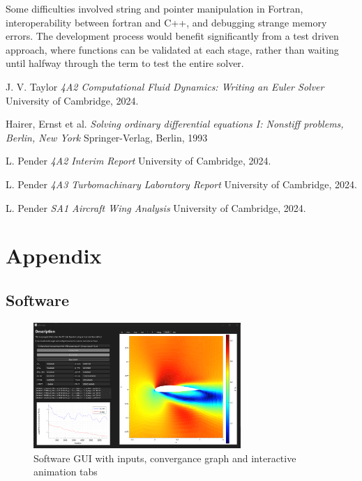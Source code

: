 \documentclass{article}
\begin{document}
Some difficulties involved string and pointer manipulation in Fortran, interoperability between fortran and C++, and debugging strange memory errors.
The development process would benefit significantly from a test driven approach, where functions can be validated at each stage, rather than waiting until halfway through the term to test the entire solver.

\begin{thebibliography}{9}

    J. V. Taylor
    \emph{4A2 Computational Fluid Dynamics: Writing an Euler Solver}
    University of Cambridge,
    2024.

    Hairer, Ernst et al.
    \emph{Solving ordinary differential equations I: Nonstiff problems, Berlin, New York}
    Springer-Verlag, Berlin, 1993

    L. Pender
    \emph{4A2 Interim Report}
    University of Cambridge,
    2024.

    L. Pender
    \emph{4A3 Turbomachinary Laboratory Report}
    University of Cambridge,
    2024.

    L. Pender
    \emph{SA1 Aircraft Wing Analysis}
    University of Cambridge,
    2024.
  
\end{thebibliography}

\section{Appendix}

\subsection{Software}

\begin{figure}[H]
    \centering
    \includegraphics[width=0.7\textwidth]{figures/software.png}
    \caption{Software GUI with inputs, convergance graph and interactive animation tabs}
    \label{fig:software}
\end{figure}
\end{document}
